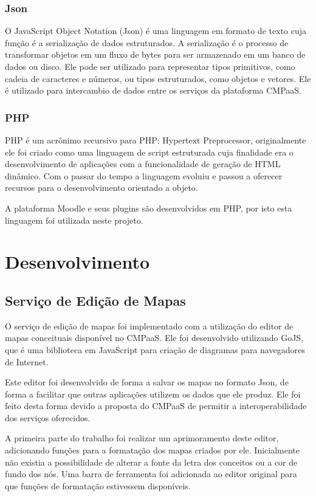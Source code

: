 \documentclass[
	12pt,				%
	openright,			%
	oneside,			%
	a4paper,			%
	english,			%
	french,				%
	spanish,			%
	brazil				%
	]{abntex2}
\begin{document}
\subsection{Json}

O JavaScript Object Notation (Json) é uma linguagem em formato de texto cuja função é a serialização de dados estruturados. A serialização é o processo de transformar objetos em um fluxo de bytes para ser armazenado em um banco de dados ou disco. Ele pode ser utilizado para representar tipos primitivos, como cadeia de caracteres e números, ou tipos estruturados, como objetos e vetores\cite{crockford2006}. Ele é utilizado para intercambio de dados entre os serviços da plataforma CMPaaS.  

\subsection{PHP}
PHP é um acrônimo recursivo para PHP: Hypertext Preprocessor, originalmente ele foi criado como uma linguagem de script estruturada cuja finalidade era o desenvolvimento de aplicações com a funcionalidade de geração de HTML dinâmico. Com o passar do tempo a linguagem evoluiu e passou a oferecer recursos para o desenvolvimento orientado a objeto\cite{minetto2007}.

A plataforma Moodle e seus plugins são desenvolvidos em PHP, por isto esta linguagem foi utilizada neste projeto. 

\chapter{Desenvolvimento}

\section{Serviço de Edição de Mapas}
O serviço de edição de mapas foi implementado com a utilização do editor de mapas conceituais disponível no CMPaaS. Ele foi desenvolvido utilizando GoJS, que é uma biblioteca em JavaScript para criação de diagramas para navegadores de Internet.

Este editor foi desenvolvido de forma a salvar os mapas no formato Json, de forma a facilitar que outras aplicações utilizem os dados que ele produz. Ele foi feito desta forma devido a proposta do CMPaaS de permitir a interoperabilidade dos serviços oferecidos.

A primeira parte do trabalho foi realizar um aprimoramento deste editor, adicionando funções para a formatação dos mapas criados por ele. Inicialmente não existia a possibilidade de alterar a fonte da letra dos conceitos ou a cor de fundo dos nós. Uma barra de ferramenta foi adicionada ao editor original para que funções de formatação estivessem disponíveis.
\end{document}
